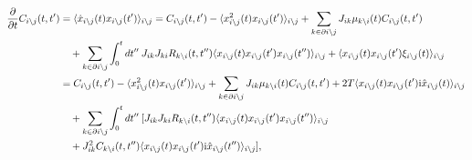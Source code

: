 \documentclass[
    preprint,
    linenumbers,
    amsmath,amssymb,amsfonts,
    aps, physrev,
    superscriptaddress,
    10pt,
    bibnotes
    ]{revtex4-2}
\begin{document}
\begin{subequations}
\begin{align}
\frac{\partial}{\partial t}C_{i\setminus j}(t,t') & =\langle\dot{x}_{i\setminus j}(t)x_{i\setminus j}(t')\rangle_{i\setminus j}=C_{i\setminus j}(t,t')-\langle x_{i\setminus j}^{2}(t)x_{i\setminus j}(t')\rangle_{i\setminus j}+\sum_{k\in\partial i\setminus j}J_{ik}\mu_{k\setminus i}(t)C_{i\setminus j}(t,t')\nonumber \\
 & \quad+\sum_{k\in\partial i\setminus j}\int_{0}^{t}dt''\:J_{ik}J_{ki}R_{k\setminus i}(t,t'')\langle x_{i\setminus j}(t)x_{i\setminus j}(t')x_{i\setminus j}(t'')\rangle_{i\setminus j}+\langle x_{i\setminus j}(t)x_{i\setminus j}(t')\xi_{i\setminus j}(t)\rangle_{i\setminus j}\\
 & =C_{i\setminus j}(t,t')-\langle x_{i\setminus j}^{2}(t)x_{i\setminus j}(t')\rangle_{i\setminus j}+\sum_{k\in\partial i\setminus j}J_{ik}\mu_{k\setminus i}(t)C_{i\setminus j}(t,t')+2T\langle x_{i\setminus j}(t)x_{i\setminus j}(t'){\rm i}\hat{x}_{i\setminus j}(t)\rangle_{i\setminus j}\nonumber \\
 & \quad+\sum_{k\in\partial i\setminus j}\int_{0}^{t}dt''\:[J_{ik}J_{ki}R_{k\setminus i}(t,t'')\langle x_{i\setminus j}(t)x_{i\setminus j}(t')x_{i\setminus j}(t'')\rangle_{i\setminus j}\nonumber \\
 & \quad+J_{ik}^{2}C_{k\setminus i}(t,t'')\langle x_{i\setminus j}(t)x_{i\setminus j}(t'){\rm i}\hat{x}_{i\setminus j}(t'')\rangle_{i\setminus j}],
\end{align}
\end{subequations}
\end{document}
